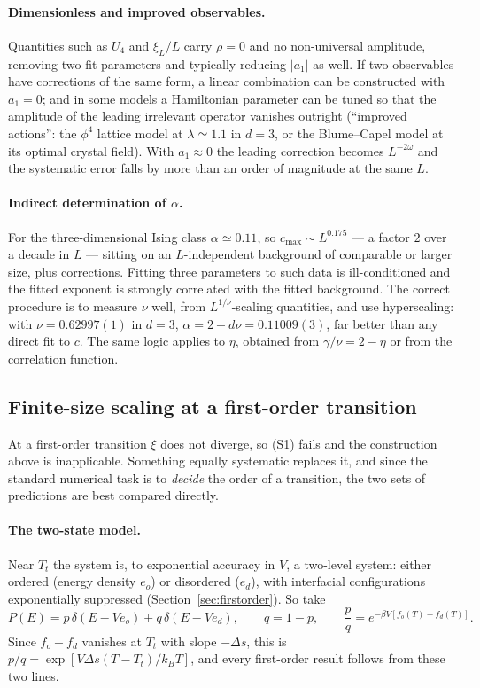 \documentclass[10pt,a4paper]{article}
\theoremstyle{remark}
\begin{document}
\paragraph{Dimensionless and improved observables.} Quantities such as $U_4$ and
$\xi_L/L$ carry $\rho=0$ and no non-universal amplitude, removing two fit
parameters and typically reducing $|a_1|$ as well. If two observables have
corrections of the same form, a linear combination can be constructed with
$a_1=0$; and in some models a Hamiltonian parameter can be tuned so that the
amplitude of the leading irrelevant operator vanishes outright (``improved
actions'': the $\phi^{4}$ lattice model at $\lambda\simeq1.1$ in $d=3$, or the
Blume--Capel model at its optimal crystal field). With $a_1\approx0$ the leading
correction becomes $L^{-2\omega}$ and the systematic error falls by more than an
order of magnitude at the same $L$.

\paragraph{Indirect determination of $\alpha$.} For the three-dimensional Ising
class $\alpha\simeq0.11$, so $c_{\max}\sim L^{0.175}$ --- a factor $2$ over a
decade in $L$ --- sitting on an $L$-independent background of comparable or
larger size, plus corrections. Fitting three parameters to such data is
ill-conditioned and the fitted exponent is strongly correlated with the fitted
background. The correct procedure is to measure $\nu$ well, from
$L^{1/\nu}$-scaling quantities, and use hyperscaling: with $\nu=0.62997(1)$ in
$d=3$, $\alpha=2-d\nu=0.11009(3)$, far better than any direct fit to $c$. The
same logic applies to $\eta$, obtained from $\gamma/\nu=2-\eta$ or from the
correlation function.

\subsection{Finite-size scaling at a first-order transition}
\label{sec:fss:firstorder}

At a first-order transition $\xi$ does not diverge, so (S1) fails and the
construction above is inapplicable. Something equally systematic replaces it, and
since the standard numerical task is to \emph{decide} the order of a transition,
the two sets of predictions are best compared directly.

\paragraph{The two-state model.} Near $T_t$ the system is, to exponential
accuracy in $V$, a two-level system: either ordered (energy density $e_o$) or
disordered ($e_d$), with interfacial configurations exponentially suppressed
(Section~\ref{sec:firstorder}). So take
\[
P(E)=p\,\delta(E-Ve_o)+q\,\delta(E-Ve_d),\qquad q=1-p,
\qquad
\frac{p}{q}=e^{-\beta V\left[f_o(T)-f_d(T)\right]} .
\]
Since $f_o-f_d$ vanishes at $T_t$ with slope $-\Delta s$, this is
$p/q=\exp[V\Delta s(T-T_t)/k_BT]$, and every first-order result follows from
these two lines.
\end{document}

